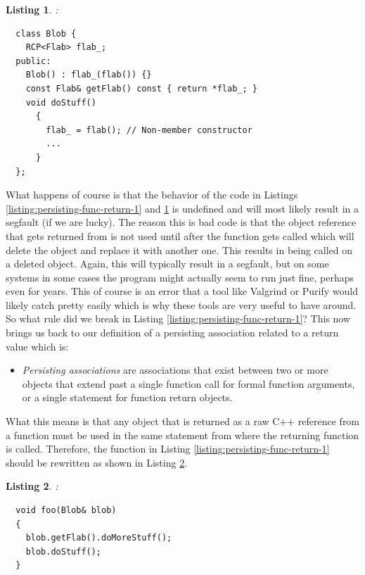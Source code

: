\documentclass[pdf,ps2pdf,11pt]{SANDreport}
\newtheorem{listing}{Listing}
\begin{document}
\begin{listing}:\\
\label{listing:bad-Blob-non-persisting}
{\small\begin{verbatim}
  class Blob {
    RCP<Flab> flab_;
  public:
    Blob() : flab_(flab()) {}
    const Flab& getFlab() const { return *flab_; }
    void doStuff()
      {
        flab_ = flab(); // Non-member constructor
        ...
      }
  };
\end{verbatim}}
\end{listing}

What happens of course is that the behavior of the code in Listings
{}\ref{listing:persisting-func-return-1} and
{}\ref{listing:bad-Blob-non-persisting} is undefined and will most
likely result in a segfault (if we are lucky).  The reason this is bad
code is that the {} object reference that gets returned
from {} is not used until after the function
{} gets called which will delete the
{} object and replace it with another one.  This results
in {} being called on a deleted object.
Again, this will typically result in a segfault, but on some systems
in some cases the program might actually seem to run just fine,
perhaps even for years.  This of course is an error that a tool like
Valgrind or Purify would likely catch pretty easily which is why these
tools are very useful to have around.  So what rule did we break in
Listing {}\ref{listing:persisting-func-return-1}?  This now brings us
back to our definition of a persisting association related to a return
value which is:

\begin{itemize}

{}\item\textit{Persisting associations} are associations that exist
between two or more objects that extend past a single function call
for formal function arguments, or a single statement for function
return objects.

\end{itemize}

What this means is that any object that is returned as a raw C++
reference from a function must be used in the same statement from
where the returning function is called.  Therefore, the function in
Listing {}\ref{listing:persisting-func-return-1} should be rewritten
as shown in Listing {}\ref{listing:non-persisting-func-return-1}.

\begin{listing}:\\
\label{listing:non-persisting-func-return-1}
{\small\begin{verbatim}
  void foo(Blob& blob)
  {
    blob.getFlab().doMoreStuff();
    blob.doStuff();
  }
\end{verbatim}}
\end{listing}
\end{document}
